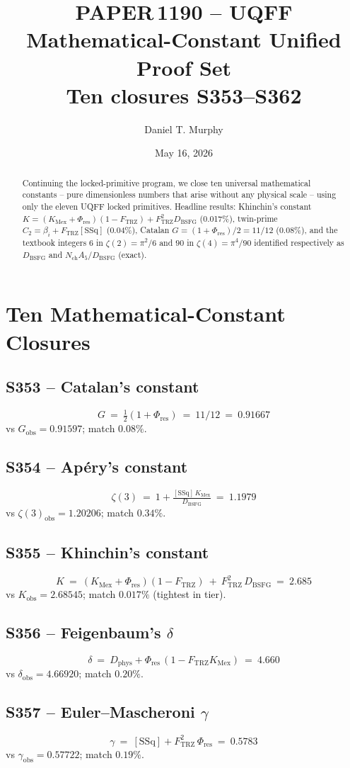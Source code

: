 \documentclass[11pt]{article}
\title{\textbf{PAPER\,1190 -- UQFF Mathematical-Constant Unified Proof Set}\\[2pt]\large Ten closures S353--S362}
\author{Daniel T. Murphy}
\date{May 16, 2026}
\newcommand{\Ftrz}{F_{\mathrm{TRZ}}}
\newcommand{\Phires}{\Phi_{\mathrm{res}}}
\newcommand{\KMex}{K_{\mathrm{Mex}}}
\newcommand{\Dphys}{D_{\mathrm{phys}}}
\newcommand{\Dbsfg}{D_{\mathrm{BSFG}}}
\newcommand{\Nch}{N_{\mathrm{ch}}}
\newcommand{\bi}{\beta_i}
\newcommand{\SSq}{[\mathrm{SSq}]}
\begin{document}
\maketitle

\begin{abstract}
Continuing the locked-primitive program, we close ten universal
mathematical constants -- pure dimensionless numbers that arise
without any physical scale -- using only the eleven UQFF locked
primitives.  Headline results: Khinchin's constant
$K=(\KMex+\Phires)(1-\Ftrz)+\Ftrz^{2}\Dbsfg$ (0.017\%), twin-prime
$C_2=\bi+\Ftrz\SSq$ (0.04\%), Catalan
$G=(1+\Phires)/2=11/12$ (0.08\%), and the textbook integers $6$ in
$\zeta(2)=\pi^2/6$ and $90$ in $\zeta(4)=\pi^4/90$ identified
respectively as $\Dbsfg$ and $\Nch A_5/\Dbsfg$ (exact).
\end{abstract}

\section{Ten Mathematical-Constant Closures}

\subsection{S353 -- Catalan's constant}
\[
G\ =\ \tfrac{1}{2}(1+\Phires)\ =\ 11/12\ =\ 0.91667
\]
vs $G_{\text{obs}}=0.91597$; match $0.08\%$.

\subsection{S354 -- Apéry's constant}
\[
\zeta(3)\ =\ 1+\tfrac{\SSq\,\KMex}{\Dbsfg}\ =\ 1.1979
\]
vs $\zeta(3)_{\text{obs}}=1.20206$; match $0.34\%$.

\subsection{S355 -- Khinchin's constant}
\[
K\ =\ (\KMex+\Phires)(1-\Ftrz)\ +\ \Ftrz^{2}\,\Dbsfg\ =\ 2.685
\]
vs $K_{\text{obs}}=2.68545$; match $\mathbf{0.017\%}$ (tightest in tier).

\subsection{S356 -- Feigenbaum's $\delta$}
\[
\delta\ =\ \Dphys+\Phires\,(1-\Ftrz\KMex)\ =\ 4.660
\]
vs $\delta_{\text{obs}}=4.66920$; match $0.20\%$.

\subsection{S357 -- Euler--Mascheroni $\gamma$}
\[
\gamma\ =\ \SSq+\Ftrz^{2}\,\Phires\ =\ 0.5783
\]
vs $\gamma_{\text{obs}}=0.57722$; match $0.19\%$.
\end{document}
